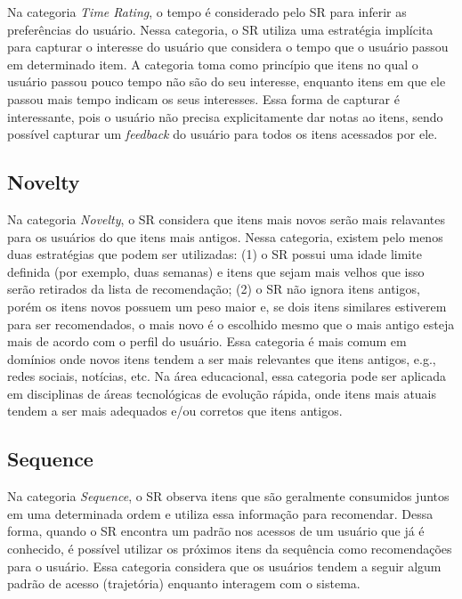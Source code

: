 Na categoria \textit{Time Rating}, o tempo é considerado pelo SR para inferir as preferências do usuário. Nessa categoria, o SR
utiliza uma estratégia implícita para capturar o interesse do usuário que considera o tempo que o usuário passou em
determinado item. A categoria toma como princípio que itens no qual o usuário passou pouco tempo não são do seu
interesse, enquanto itens em que ele passou mais tempo indicam os seus interesses. Essa forma de capturar é interessante,
pois o usuário não precisa explicitamente dar notas ao itens, sendo possível capturar um \textit{feedback} do usuário
para todos os itens acessados por ele.

\subsection{Novelty}

Na categoria \textit{Novelty}, o SR considera que itens mais novos serão mais relavantes para os usuários do que itens mais
antigos. Nessa categoria, existem pelo menos duas estratégias que podem ser utilizadas: (1) o SR possui uma idade limite
definida (por exemplo, duas semanas) e itens que sejam mais velhos que isso serão retirados da lista de recomendação;
(2) o SR não ignora itens antigos, porém os itens novos possuem um peso maior e, se dois itens similares estiverem para
ser recomendados, o mais novo é o escolhido mesmo que o mais antigo esteja mais de acordo com o perfil do usuário.
Essa categoria é mais comum em domínios onde novos itens tendem a ser mais relevantes que itens antigos, e.g., redes
sociais, notícias, etc. Na área educacional, essa categoria pode ser aplicada em disciplinas de áreas tecnológicas de evolução rápida,
onde itens mais atuais tendem a ser mais adequados e/ou corretos que itens antigos.

\subsection{Sequence}\label{subsection:sequence}

Na categoria \textit{Sequence}, o SR observa itens que são geralmente consumidos juntos em uma determinada ordem e utiliza essa
informação para recomendar. Dessa forma, quando o SR encontra um padrão nos acessos de um usuário que já é conhecido,
é possível utilizar os próximos itens da sequência como recomendações para o usuário. Essa categoria considera que os usuários
tendem a seguir algum padrão de acesso (trajetória) enquanto interagem com o sistema.

